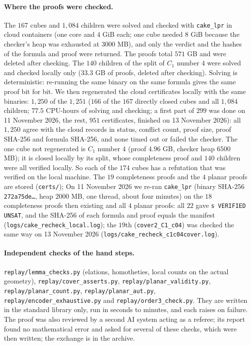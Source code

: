 \documentclass[11pt]{article}
\theoremstyle{plain}
\theoremstyle{remark}
\newcommand{\file}[1]{\texttt{#1}}
\begin{document}
\paragraph{Where the proofs were checked.}
The $167$ cubes and $1{,}084$ children were solved and checked with \texttt{cake\_lpr} in cloud containers (one core and $4$ GiB each; one cube needed $8$ GiB because the checker's heap was exhausted at $3000$ MB), and only the verdict and the hashes of the formula and proof were returned.
The proofs total $571$ GB and were deleted after checking.
The $140$ children of the split of $C_1$ number $4$ were solved and checked locally only ($33.3$ GB of proofs, deleted after checking).
Solving is deterministic: re-running the same binary on the same formula gives the same proof bit for bit.
We then regenerated the cloud certificates locally with the same binaries: $1{,}250$ of the $1{,}251$ ($166$ of the $167$ directly closed cubes and all $1{,}084$ children; $77.5$ CPU-hours of solving and checking; a first part of $299$ was done on 11 November 2026, the rest, $951$ certificates, finished on 13 November 2026): all $1{,}250$ agree with the cloud records in status, conflict count, proof size, proof SHA-256 and formula SHA-256, and none timed out or failed the checker.
The one cube not regenerated is $C_1$ number $4$ (proof $4.96$ GB, checker heap $6500$ MB); it is closed locally by its split, whose completeness proof and $140$ children were all verified locally.
So each of the $174$ cubes has a refutation that was verified on the local machine.
The $19$ completeness proofs and the $4$ planar proofs are stored (\file{certs/}); On 11 November 2026 we re-ran \texttt{cake\_lpr} (binary SHA-256 \texttt{272a75de\dots}, heap $2000$ MB, one thread, about four minutes) on the $18$ completeness proofs then existing and all $4$ planar proofs: all $22$ gave \texttt{s VERIFIED UNSAT}, and the SHA-256 of each formula and proof equals the manifest (\file{logs/cake\_recheck\_local.log}); the $19$th (\file{cover2\_C1\_c04}) was checked the same way on 13 November 2026 (\file{logs/cake\_recheck\_c1c04cover.log}).

\paragraph{Independent checks of the hand steps.}
\file{replay/lemma\_checks.py} (elations, homotheties, local counts on the actual geometry), \file{replay/cover\_asserts.py}, \file{replay/planar\_validity.py}, \file{replay/planar\_count.py}, \file{replay/planar\_aut.py}, \file{replay/encoder\_exhaustive.py} and \file{replay/order3\_check.py}.
They are written in the standard library only, run in seconds to minutes, and each raises on failure.
The proof was also reviewed by a second AI system acting as a referee; its report found no mathematical error and asked for several of these checks, which were then written; the exchange is in the archive.
\end{document}
